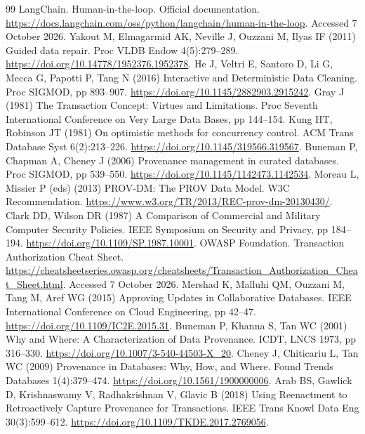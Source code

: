 \documentclass[10pt,a4paper,twocolumn]{article}
\begin{document}
\begin{thebibliography}{99}
 LangChain. Human-in-the-loop. Official documentation. \url{https://docs.langchain.com/oss/python/langchain/human-in-the-loop}. Accessed 7 October 2026.
 Yakout M, Elmagarmid AK, Neville J, Ouzzani M, Ilyas IF (2011) Guided data repair. Proc VLDB Endow 4(5):279--289. \url{https://doi.org/10.14778/1952376.1952378}.
 He J, Veltri E, Santoro D, Li G, Mecca G, Papotti P, Tang N (2016) Interactive and Deterministic Data Cleaning. Proc SIGMOD, pp 893--907. \url{https://doi.org/10.1145/2882903.2915242}.
 Gray J (1981) The Transaction Concept: Virtues and Limitations. Proc Seventh International Conference on Very Large Data Bases, pp 144--154.
 Kung HT, Robinson JT (1981) On optimistic methods for concurrency control. ACM Trans Database Syst 6(2):213--226. \url{https://doi.org/10.1145/319566.319567}.
 Buneman P, Chapman A, Cheney J (2006) Provenance management in curated databases. Proc SIGMOD, pp 539--550. \url{https://doi.org/10.1145/1142473.1142534}.
 Moreau L, Missier P (eds) (2013) PROV-DM: The PROV Data Model. W3C Recommendation. \url{https://www.w3.org/TR/2013/REC-prov-dm-20130430/}.
 Clark DD, Wilson DR (1987) A Comparison of Commercial and Military Computer Security Policies. IEEE Symposium on Security and Privacy, pp 184--194. \url{https://doi.org/10.1109/SP.1987.10001}.
 OWASP Foundation. Transaction Authorization Cheat Sheet. \url{https://cheatsheetseries.owasp.org/cheatsheets/Transaction_Authorization_Cheat_Sheet.html}. Accessed 7 October 2026.
 Mershad K, Malluhi QM, Ouzzani M, Tang M, Aref WG (2015) Approving Updates in Collaborative Databases. IEEE International Conference on Cloud Engineering, pp 42--47. \url{https://doi.org/10.1109/IC2E.2015.31}.
 Buneman P, Khanna S, Tan WC (2001) Why and Where: A Characterization of Data Provenance. ICDT, LNCS 1973, pp 316--330. \url{https://doi.org/10.1007/3-540-44503-X_20}.
 Cheney J, Chiticariu L, Tan WC (2009) Provenance in Databases: Why, How, and Where. Found Trends Databases 1(4):379--474. \url{https://doi.org/10.1561/1900000006}.
 Arab BS, Gawlick D, Krishnaswamy V, Radhakrishnan V, Glavic B (2018) Using Reenactment to Retroactively Capture Provenance for Transactions. IEEE Trans Knowl Data Eng 30(3):599--612. \url{https://doi.org/10.1109/TKDE.2017.2769056}.

\end{thebibliography}
\end{document}
